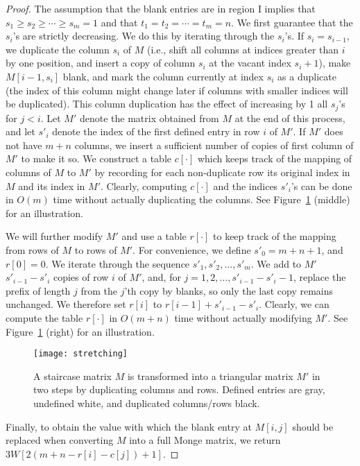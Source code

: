 \documentclass{llncs}
\begin{document}
\begin{proof}
The assumption that the blank entries are in region I implies that $s_1 \geq s_2 \geq \cdots \geq s_m=1$ and that $t_1=t_2=\cdots = t_m = n$. 
We first guarantee that the $s_i$'s are strictly decreasing. We do this by iterating through the $s_i$'s. If $s_i = s_{i-1}$, we duplicate the column $s_i$ of $M$ (i.e., shift all columns at indices greater than $i$ by one position, and insert a copy of column $s_i$ at the vacant index $s_i+1$), make $M[i-1,s_i]$ blank, and mark the column currently at index $s_i$ as a duplicate (the index of this column might change later if columns with smaller indices will be duplicated). This column duplication has the effect of increasing by 1 all $s_j$'s for $j<i$. Let $M'$ denote the matrix obtained from $M$ at the end of this process, and let $s'_i$ denote the index of the first defined entry in row $i$ of $M'$. If $M'$ does not have $m+n$ columns, we insert a sufficient number of copies of first column of $M'$ to make it so. 
We construct a table $c[\cdot]$ which keeps track of the mapping of columns of $M$ to $M'$ by recording for each non-duplicate row its original index in $M$ and its index in $M'$. Clearly, computing $c[\cdot]$ and the indices $s'_i$'s can be done in $O(m)$ time without actually duplicating the columns. See Figure~\ref{fig:stretch} (middle) for an illustration.

We will further modify $M'$ and 
 use a table $r[\cdot]$ to keep track of the mapping from rows of $M$ to rows of $M'$. 
For convenience, we define $s'_0 = m+n+1$, and $r[0] =0$. We iterate through the sequence $s'_1,s'_2, \dots, s'_m$. 
We add to $M'$ $s'_{i-1}-s'_i$ copies of row $i$ of $M'$, and, for $j=1,2, \dots, s'_{i-1}-s'_i-1$, replace the prefix of length $j$ from the $j$'th copy by blanks, so only the last copy remains unchanged. We therefore set $r[i]$ to $r[i-1]+s'_{i-1}-s'_i$. Clearly, we can compute the table $r[\cdot]$ in $O(m+n)$ time without actually modifying $M'$.
See Figure~\ref{fig:stretch} (right) for an illustration.

\begin{figure}[h!]
\centering
   \texttt{[image: stretching]}
   \caption{
   A staircase matrix $M$ is transformed into a triangular matrix $M'$ in two steps by duplicating columns and rows. Defined entries
   are gray, undefined white, and duplicated columns/rows black.\label{fig:stretch}}
 \end{figure}

Finally, to obtain the value with which the blank entry at $M[i,j]$ should be replaced when converting $M$ into a full Monge matrix, we return $3W[2(m+n-r[i]-c[j])+1]$.


\end{proof}
\end{document}
